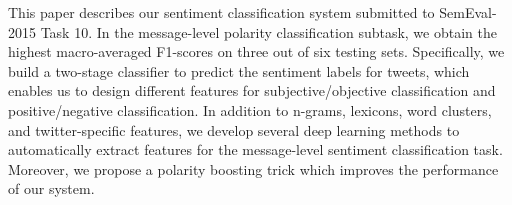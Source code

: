 This paper describes our sentiment classification system submitted to SemEval-2015 Task 10. In the message-level polarity classification subtask, we obtain the highest macro-averaged F1-scores on three out of six testing sets. Specifically, we build a two-stage classifier to predict the sentiment labels for tweets, which enables us to design different features for subjective/objective classification and positive/negative classification. In addition to n-grams, lexicons, word clusters, and twitter-specific features, we develop several deep learning methods to automatically extract features for the message-level sentiment classification task. Moreover, we propose a polarity boosting trick which improves the performance of our system.
